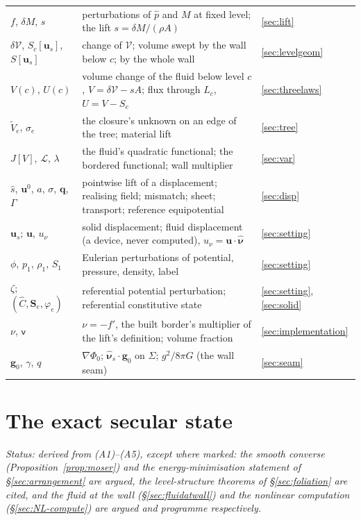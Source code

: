 \documentclass[11pt]{article}
\theoremstyle{definition}
\theoremstyle{remark}
\newcommand{\bu}{\mathbf{u}}
\newcommand{\bq}{\mathbf{q}}
\newcommand{\Vol}{\mathcal V}
\newcommand{\Vt}{\tilde V}
\newcommand{\Ltot}{\mathcal L}
\newcommand{\nuh}{\hat{\boldsymbol{\nu}}}
\newcommand{\nuhs}{\hat{\boldsymbol{\nu}}_s}
\newcommand{\Se}{\mathbf{S}_e}
\newcommand{\status}[1]{\noindent\emph{Status: #1}\par\smallskip}
\begin{document}
\begin{table}[!tb]
\begin{tabular}{@{}l p{} l@{}}
$f$, $\delta M$, $s$ & perturbations of $\hat p$ and $M$ at fixed level; the lift $s = \delta M/(\rho A)$ & \ref{sec:lift} \\
$\delta\Vol$, $S_c[\bu_s]$, $S[\bu_s]$ & change of $\Vol$; volume swept by the wall below $c$; by the whole wall & \ref{sec:levelgeom} \\
$V(c)$, $U(c)$ & volume change of the fluid below level $c$, $V = \delta\Vol - sA$; flux through $L_c$, $U = V - S_c$ & \ref{sec:threelaws} \\
$\Vt_e$, $\sigma_e$ & the closure's unknown on an edge of the tree; material lift & \ref{sec:tree} \\
$J[V]$, $\Ltot$, $\lambda$ & the fluid's quadratic functional; the bordered functional; wall multiplier & \ref{sec:var} \\
$\hat s$, $\bu^0$, $a$, $\sigma$, $\bq$, $\Gamma$ & pointwise lift of a displacement; realising field; mismatch; sheet; transport; reference equipotential & \ref{sec:disp} \\
$\bu_s$; $\bu$, $u_\nu$ & solid displacement; fluid displacement (a device, never computed), $u_\nu = \bu\cdot\nuh$ & \ref{sec:setting} \\
$\phi$, $p_1$, $\rho_1$, $S_1$ & Eulerian perturbations of potential, pressure, density, label & \ref{sec:setting} \\
$\zeta$; $(\hat C, \Se, \varphi_e)$ & referential potential perturbation; referential constitutive state & \ref{sec:setting}, \ref{sec:solid} \\
$\nu$, $\mathsf v$ & $\nu = -f'$, the built border's multiplier of the lift's definition; volume fraction & \ref{sec:implementation} \\
$\mathbf g_0$, $\gamma$, $q$ & $\nabla\Phi_0$; $\nuhs\cdot\mathbf g_0$ on $\Sigma$; $g^2/8\pi G$ (the wall seam) & \ref{sec:seam} \\
\bottomrule
\end{tabular}
\end{table}

\section{The exact secular state}
\label{sec:nonlinear}
\label{sec:exact}

\status{derived from (A1)--(A5), except where marked: the smooth
converse (Proposition~\ref{prop:moser}) and the energy-minimisation
statement of \S\ref{sec:arrangement} are argued, the level-structure
theorems of \S\ref{sec:foliation} are cited, and the fluid at the wall
(\S\ref{sec:fluidatwall}) and the nonlinear computation
(\S\ref{sec:NL-compute}) are argued and programme respectively.}
\end{document}
